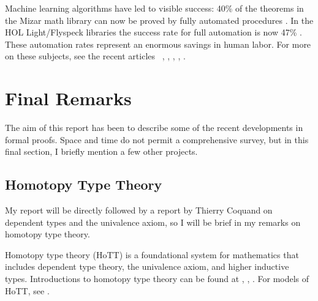 \documentclass[brochure,english,12pt]{bourbaki}
\theoremstyle{plain}
\def\ring#1{{\mathbb{#1}}}
\begin{document}
Machine learning algorithms have led to visible success: 40\% of the
theorems in the Mizar math library can now be proved by fully automated procedures \cite{DBLP:journals/corr/KaliszykU13b}.  
In the HOL Light/Flyspeck
libraries the success rate for full automation is now 47\% \cite{kaliszyk2014learning}.
These automation rates represent an enormous savings in human labor.
For more on these subjects, see the recent articles
~\cite{bohme2010sledgehammer}, 
\cite{urban2010evaluation},  
\cite{kaliszyk2012learning}, \cite{kaliszyk2013automated},
\cite{alama2014premise}.











\section{Final Remarks}

The aim of this report has been to describe some of the recent developments in formal proofs.
Space and time do not permit a comprehensive survey, but in this final section, I briefly mention
a few other projects.


\subsection{Homotopy Type Theory}

My report will be directly followed by a report by Thierry Coquand on dependent types and
the univalence axiom, so I will be brief in my remarks on homotopy type theory.

Homotopy type theory (HoTT) is a foundational system for mathematics that includes
dependent type theory, the univalence axiom, and higher inductive types.  
Introductions to homotopy type theory can be found at \cite{awodey2007homotopy},
\cite{aczel2013homotopy},  \cite{pelayo2012homotopy}.
For models of HoTT, see \cite{kapulkin2012simplicial}.
\end{document}
